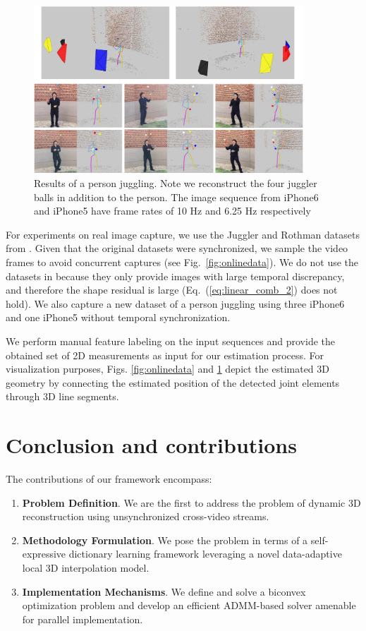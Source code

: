 \begin{figure}
\centering
\includegraphics[width=0.9\textwidth]{chapter5/resource/3_pdfsam_image_cropped.pdf}
\caption{Results of a person juggling. Note we reconstruct the four juggler balls in addition to the person. The image sequence from iPhone6 and iPhone5 have frame rates of 10 Hz and 6.25 Hz respectively}
\label{fig:juggler2}
\end{figure}
For experiments on real image capture, we use the Juggler and Rothman datasets from \cite{ballan2010unstructured}. Given that the original datasets were synchronized, we sample the video frames to avoid concurrent captures (see Fig.~\ref{fig:onlinedata}). 
We do not use the datasets in \cite{Basha_ECCV2012,Park_ECCV2010} because they only provide images with large temporal discrepancy, and therefore the shape residual is large (\ie Eq.~(\ref{eq:linear_comb_2}) does not hold). We also capture a new dataset of a person juggling using three iPhone6 and one iPhone5 without temporal synchronization. 

We perform manual feature labeling on the input sequences and provide the obtained set of 2D measurements as input for our estimation process.
For visualization purposes, Figs. \ref{fig:onlinedata} and \ref{fig:juggler2} depict the estimated 3D geometry by connecting the estimated position of the detected joint elements through 3D line segments. 


\section{Conclusion and contributions} \label{sec:conclusion}

The contributions of our framework encompass:
\begin{enumerate}%
\item {\bf Problem Definition}. We are the first to address the problem of dynamic 3D reconstruction using unsynchronized cross-video streams.
\item {\bf Methodology Formulation}. We pose the problem in terms of a self-expressive dictionary learning framework leveraging a novel data-adaptive local 3D interpolation model.  
\item {\bf Implementation Mechanisms}. We define and solve a biconvex optimization problem and develop an efficient ADMM-based solver amenable for parallel implementation.
\end{enumerate}

